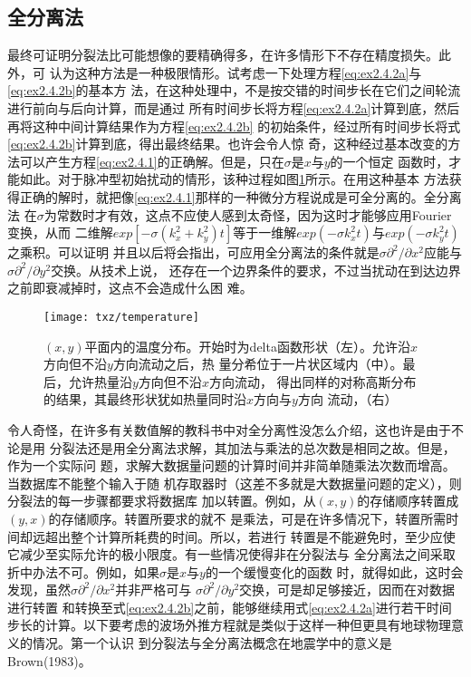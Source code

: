 \subsection{全分离法}
\label{sec:2.4.3}
最终可证明分裂法比可能想像的要精确得多，在许多情形下不存在精度损失。此外，可
认为这种方法是一种极限情形。试考虑一下处理方程\ref{eq:ex2.4.2a}与\ref{eq:ex2.4.2b}的基本方
法，在这种处理中，不是按交错的时间步长在它们之间轮流进行前向与后向计算，而是通过
所有时间步长将方程\ref{eq:ex2.4.2a}计算到底，然后再将这种中间计算结果作为方程\ref{eq:ex2.4.2b}
的初始条件，经过所有时间步长将式\ref{eq:ex2.4.2b}计算到底，得出最终结果。也许会令人惊
奇，这种经过基本改变的方法可以产生方程\ref{eq:ex2.4.1}的正确解。但是，只在$\sigma$是$x$与$y$的一个恒定
函数时，才能如此。对于脉冲型初始扰动的情形，该种过程如图\ref{fig:txz/temperature}所示。在用这种基本
方法获得正确的解时，就把像\ref{eq:ex2.4.1}那样的一种微分方程说成是可全分离的。全分离法
在$\sigma$为常数时才有效，这点不应使人感到太奇怪，因为这时才能够应用Fourier变换，从而
二维解$exp[-\sigma(k_x^2+k_y^2)t]$等于一维解$exp(-\sigma k_x^2t)$与$exp(-\sigma k_y^2t)$之乘积。可以证明
并且以后将会指出，可应用全分离法的条件就是$\sigma \partial^2/\partial x^2$应能与$\sigma \partial^2/\partial y^2$交换。从技术上说，
还存在一个边界条件的要求，不过当扰动在到达边界之前即衰减掉时，这点不会造成什么困
难。
\begin{figure}[H]
\centering
\texttt{[image: txz/temperature]}
\caption[temperature]{$(x,y)$平面内的温度分布。开始时为delta函数形状（左）。允许沿$x$方向但不沿$y$方向流动之后，热
量分希位于一片状区域内（中）。最后，允许热量沿$y$方向但不沿$x$方向流动，
得出同样的对称高斯分布的结果，其最终形状犹如热量同时沿$x$方向与$y$方向
流动，（右）}
\label{fig:txz/temperature}
\end{figure}


令人奇怪，在许多有关数值解的教科书中对全分离性没怎么介绍，这也许是由于不论是用
分裂法还是用全分离法求解，其加法与乘法的总次数是相同之故。但是，作为一个实际问
题，求解大数据量问题的计算时间并非简单随乘法次数而增高。当数据库不能整个输入于随
机存取器时（这差不多就是大数据量问题的定义），则分裂法的每一步骤都要求将数据库
加以转置。例如，从$(x,y)$的存储顺序转置成$(y,x)$的存储顺序。转置所要求的就不
是乘法，可是在许多情况下，转置所需时间却远超出整个计算所耗费的时间。所以，若进行
转置是不能避免时，至少应使它减少至实际允许的极小限度。有一些情况使得非在分裂法与
全分离法之间采取折中办法不可。例如，如果$\sigma$是$x$与$y$的一个缓慢变化的函数
时，就得如此，这时会发现，虽然$\sigma \partial^2/\partial x^2$并非严格可与
$\sigma \partial^2/\partial y^2$交换，可是却足够接近，因而在对数据进行转置
和转换至式\ref{eq:ex2.4.2b}之前，能够继续用式\ref{eq:ex2.4.2a}进行若干时间
步长的计算。以下要考虑的波场外推方程就是类似于这样一种但更具有地球物理意义的情况。第一个认识
到分裂法与全分离法概念在地震学中的意义是Brown(1983)。

